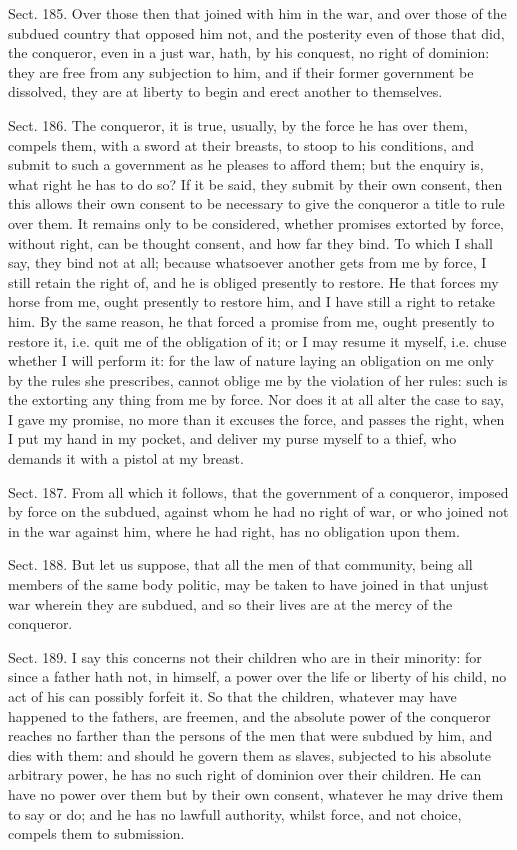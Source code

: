 \documentclass[11pt,openany]{book}
\begin{document}
Sect. 185. Over those then that joined with him in the war, and over those of the subdued country that opposed him not, and the posterity even of those that did, the conqueror, even in a just war, hath, by his conquest, no right of dominion: they are free from any subjection to him, and if their former government be dissolved, they are at liberty to begin and erect another to themselves.

Sect. 186. The conqueror, it is true, usually, by the force he has over them, compels them, with a sword at their breasts, to stoop to his conditions, and submit to such a government as he pleases to afford them; but the enquiry is, what right he has to do so? If it be said, they submit by their own consent, then this allows their own consent to be necessary to give the conqueror a title to rule over them. It remains only to be considered, whether promises extorted by force, without right, can be thought consent, and how far they bind. To which I shall say, they bind not at all; because whatsoever another gets from me by force, I still retain the right of, and he is obliged presently to restore. He that forces my horse from me, ought presently to restore him, and I have still a right to retake him. By the same reason, he that forced a promise from me, ought presently to restore it, i.e. quit me of the obligation of it; or I may resume it myself, i.e. chuse whether I will perform it: for the law of nature laying an obligation on me only by the rules she prescribes, cannot oblige me by the violation of her rules: such is the extorting any thing from me by force. Nor does it at all alter the case to say, I gave my promise, no more than it excuses the force, and passes the right, when I put my hand in my pocket, and deliver my purse myself to a thief, who demands it with a pistol at my breast.

Sect. 187. From all which it follows, that the government of a conqueror, imposed by force on the subdued, against whom he had no right of war, or who joined not in the war against him, where he had right, has no obligation upon them.

Sect. 188. But let us suppose, that all the men of that community, being all members of the same body politic, may be taken to have joined in that unjust war wherein they are subdued, and so their lives are at the mercy of the conqueror.

Sect. 189. I say this concerns not their children who are in their minority: for since a father hath not, in himself, a power over the life or liberty of his child, no act of his can possibly forfeit it. So that the children, whatever may have happened to the fathers, are freemen, and the absolute power of the conqueror reaches no farther than the persons of the men that were subdued by him, and dies with them: and should he govern them as slaves, subjected to his absolute arbitrary power, he has no such right of dominion over their children. He can have no power over them but by their own consent, whatever he may drive them to say or do; and he has no lawfull authority, whilst force, and not choice, compels them to submission.
\end{document}

